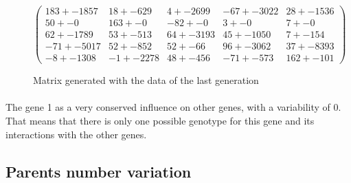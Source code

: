 \documentclass[]{report} %
\begin{document}
    \begin{figure}[H] 
            \centering
            \small
    $
          \begin{pmatrix}
                183 +- 1857 & 18 +- 629 & 4 +- 2699 & -67 +- 3022 & 28 +- 1536 \\
                50 +- 0 & 163 +- 0 & -82 +- 0 & 3 +- 0 & 7 +- 0 \\
                62 +- 1789 & 53 +- 513 & 64 +- 3193 & 45 +- 1050 & 7 +- 154 \\
                -71 +- 5017 & 52 +- 852 & 52 +- 66 & 96 +- 3062 & 37 +- 8393 \\
                -8 +- 1308 & -1 +- 2278 & 48 +- 456 & -71 +- 573 & 162 +- 101 
          \end{pmatrix}
    $
            \caption{\footnotesize Matrix generated with the data of the last generation}
            \label{mat:ps300xg200xmr1-10-10}
    \end{figure}
    \paragraph*{}
    The gene 1 as a very conserved influence on other genes, with a variability of 0. That means that there is only one possible genotype for this gene and its interactions with the other genes.
    
    
    \newpage
\subsection{Parents number variation}
\end{document}
